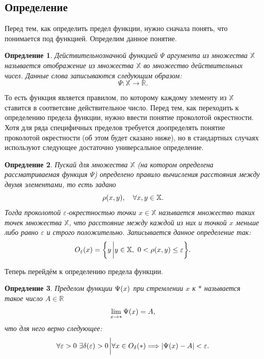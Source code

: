 \documentclass[12pt]{article}
\newtheorem{definition}{Опредление}[section]
\begin{document}
\subsection{Определение}
Перед тем, как определить предел функции, нужно сначала понять, что понимается под функцией. Определим данное понятие.
\begin{definition}
Действительнозначной функцией $\Psi$ аргумента из множества $\mathbb{X}$ называется отображение из множества $\mathbb{X}$ во множество действительных чисел. Данные слова записываются следующим образом:
\begin{equation}
    \Psi : \mathbb{X}\longrightarrow\mathbb{R}.
\end{equation}
\end{definition}
То есть функция является правилом, по которому каждому элементу из $\mathbb{X}$ ставится в соответсвие действительное число. Перед тем, как переходить к определению предела функции, нужно ввести понятие проколотой окрестности. Хотя для ряда специфичных пределов требуется доопределять понятие проколотой окрестности (об этом будет сказано ниже), но в стандартных случаях используют следующее достаточно универсальное определение.
\begin{definition}\label{def:o}
Пускай для множества $\mathbb{X}$ (на котором определена рассматриваемая функция $\Psi$) определено правило вычисления расстояния между двумя элементами, то есть задано
\begin{equation}
    \rho\qty(x,y), \quad \forall x,y \in \mathbb{X}.
\end{equation}
Тогда проколотой $\varepsilon$\--окрестностью точки $x\in \mathbb{X}$ называется множество таких точек множества $\mathbb{X}$, что расстояние между каждой из них и точкой $x$ меньше либо равно $\varepsilon$ и строго положительно. Записывается данное определение так:
\begin{equation}
    O_\varepsilon \qty(x) = \qty{y\eval y \in \mathbb{X},\ 0<\rho\qty(x,y) \le \varepsilon}.
\end{equation}
\end{definition}
Теперь перейдём к определению предела функции.
\begin{definition}\label{def:23}
Пределом функции $\Psi\qty(x)$ при стремлении $x$ к $*$ называется такое число $A \in \mathbb{R}$
\begin{equation}
    \lim_{x\rightarrow *}{\Psi\qty(x)} = A,
\end{equation}
что для него верно следующее:
\begin{equation}
    \forall \varepsilon > 0\ \exists \delta\qty(\varepsilon) > 0 \eval \forall x \in O_\delta\qty(*) \Longrightarrow \abs{\Psi\qty(x) - A} < \varepsilon.
\end{equation}
\end{definition}
\end{document}
